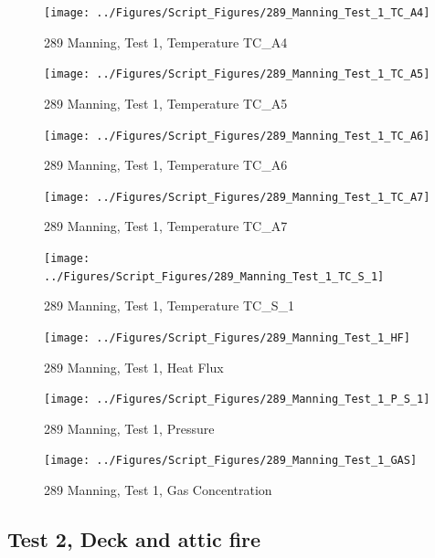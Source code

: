 \documentclass[12pt,oneside]{book}
\begin{document}
\begin{figure}[!ht]
\texttt{[image: ../Figures/Script\_Figures/289\_Manning\_Test\_1\_TC\_A4]}
\caption{289 Manning, Test 1, Temperature TC\_A4}
\label{fig:289_Manning_Test_1_TC_A4}
\end{figure}

\begin{figure}[!ht]
\texttt{[image: ../Figures/Script\_Figures/289\_Manning\_Test\_1\_TC\_A5]}
\caption{289 Manning, Test 1, Temperature TC\_A5}
\label{fig:289_Manning_Test_1_TC_A5}
\end{figure}

\begin{figure}[!ht]
\texttt{[image: ../Figures/Script\_Figures/289\_Manning\_Test\_1\_TC\_A6]}
\caption{289 Manning, Test 1, Temperature TC\_A6}
\label{fig:289_Manning_Test_1_TC_A6}
\end{figure}

\begin{figure}[!ht]
\texttt{[image: ../Figures/Script\_Figures/289\_Manning\_Test\_1\_TC\_A7]}
\caption{289 Manning, Test 1, Temperature TC\_A7}
\label{fig:289_Manning_Test_1_TC_A7}
\end{figure}

\begin{figure}[!ht]
\texttt{[image: ../Figures/Script\_Figures/289\_Manning\_Test\_1\_TC\_S\_1]}
\caption{289 Manning, Test 1, Temperature TC\_S\_1}
\label{fig:289_Manning_Test_1_TC_S_1}
\end{figure}

\begin{figure}[!ht]
\texttt{[image: ../Figures/Script\_Figures/289\_Manning\_Test\_1\_HF]}
\caption{289 Manning, Test 1, Heat Flux}
\label{fig:289_Manning_Test_1_HF}
\end{figure}

\begin{figure}[!ht]
\texttt{[image: ../Figures/Script\_Figures/289\_Manning\_Test\_1\_P\_S\_1]}
\caption{289 Manning, Test 1, Pressure}
\label{fig:289_Manning_Test_1_P_S_1}
\end{figure}

\begin{figure}[!ht]
\texttt{[image: ../Figures/Script\_Figures/289\_Manning\_Test\_1\_GAS]}
\caption{289 Manning, Test 1, Gas Concentration}
\label{fig:289_Manning_Test_1_GAS}
\end{figure}


\clearpage


\subsection{Test 2, Deck and attic fire}
\end{document}
